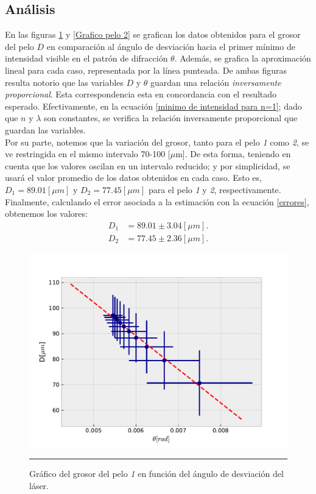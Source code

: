 \documentclass[10pt,a4paper]{article}
\begin{document}
	\begin{multicols}{2}
			
	\section{Análisis}
	En las figuras \ref{Grafico pelo 1} y \ref{Grafico pelo 2} se grafican los datos obtenidos para el grosor del pelo $D$ en comparación al ángulo de desviación hacia el primer mínimo de intensidad visible en el patrón de difracción $\theta$. Además, se grafica la aproximación lineal para cada caso, representada por la línea punteada. De ambas figuras resulta notorio que las variables $D$ y $\theta$ guardan una relación \emph{inversamente proporcional}. Esta correspondencia esta en concordancia con el resultado esperado. Efectivamente, en la ecuación \ref{minimo de intensidad para n=1}; dado que $n$ y $\lambda$ son constantes, se verifica la relación inversamente proporcional que guardan las variables.\\
	
	Por su parte, notemos que la variación del grosor, tanto para el pelo \textit{1} como \textit{2}, se ve restringida en el mismo intervalo 70-100 [$\mu$m]. De esta forma, teniendo en cuenta que los valores oscilan en un intervalo reducido; y por simplicidad, se usará el valor promedio de los datos obtenidos en cada caso. Esto es, $D_1 = 89.01 [\mu m]$ y $D_2 = 77.45 [\mu m]$ para el pelo \textit{1} y \textit{2}, respectivamente.\\
	
	Finalmente, calculando el error asociada a la estimación con la ecuación \ref{errores}, obtenemos los valores:
	\begin{align}
	D_1 &= 89.01 \pm 3.04 [\mu m]. \\
	D_2 &= 77.45 \pm 2.36 [\mu m].
	\end{align}
 \begin{figure}[H]
		\centering
		\includegraphics[scale=0.4]{Pelo_1.pdf}
		\caption{Gráfico del grosor del pelo \textit{1} en función del ángulo de desviación del láser. }
		\label{Grafico pelo 1}
		\rule{80mm}{0.1mm}
	\end{figure}
	

\end{multicols}
\end{document}
